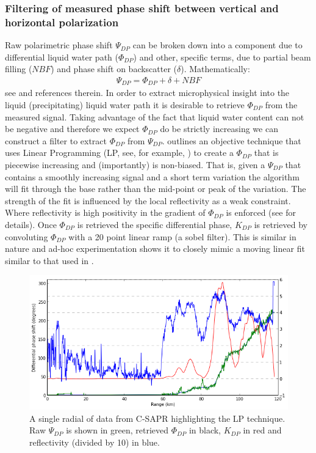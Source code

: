 \documentclass[twocol]{ametsoc}
\begin{document}
\subsubsection{Filtering of measured phase shift between vertical and horizontal polarization}
\label{sssec:lp}
Raw polarimetric phase shift $\Psi_{DP}$ can be broken down into a component due to differential liquid water path  ($\Phi_{DP}$) and other, specific terms, due to partial beam filling ($NBF$) and phase shift on backscatter ($\delta$). Mathematically:
\begin{align}
\Psi_{DP} = \Phi_{DP} + \delta + NBF
\end{align}
see \cite{gian_2008} and references therein. In order to extract microphysical insight into the liquid (precipitating) liquid water path it is desirable to retrieve $\Phi_{DP}$ from the measured signal. Taking advantage of the fact that liquid water content can not be negative and therefore we expect $\Phi_{DP}$ do be strictly increasing we can construct a filter to extract $\Phi_{DP}$ from $\Psi_{DP}$.  \cite{giangrande_application_2013} outlines an objective technique that uses Linear Programming  (LP, see, for example, \cite{hell_lp}) to create a $\Phi_{DP}$ that is piecewise increasing and (importantly) is non-biased. That is, given a $\Psi_{DP} $ that contains a smoothly increasing signal and a short term variation the algorithm will fit through the base rather than the mid-point or peak of the variation. The strength of the fit is influenced by the local reflectivity as a weak constraint. Where reflectivity is high positivity in the gradient of $ \Phi_{DP}$ is enforced (see  \cite{gian_2008} for details).  Once $\Phi_{DP}$ is retrieved the specific differential phase, $K_{DP}$ is retrieved by convoluting $\Phi_{DP}$ with a 20 point linear ramp (a sobel filter). This is similar in nature and ad-hoc experimentation shows it to closely mimic a moving linear fit similar to that used in \cite{bringi_methodology_2002}.
\begin{figure}[h]
    \centering
    \includegraphics[width=0.95\columnwidth]{lp1.png}
    \caption{A single radial of data from C-SAPR highlighting the LP technique. Raw $\Psi_{DP}$ is shown in green, retrieved $\Phi_{DP}$ in black, $K_{DP}$ in red and reflectivity (divided by 10) in blue.}
    \label{fig:lp1}
\end{figure}
\end{document}
